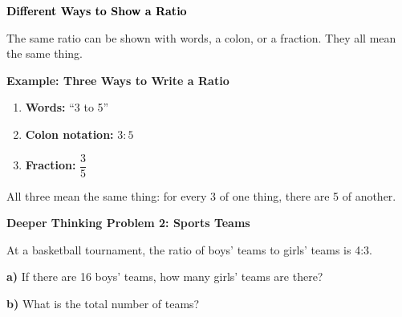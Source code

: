 \documentclass[12pt, letterpaper, fleqn]{article}
\begin{document}
\newpage

\begin{tcolorbox}[colback=customteal!20]
\large\textcolor{black}{\textbf{Different Ways to Show a Ratio}}
\end{tcolorbox}

\noindent
The same ratio can be shown with words, a colon, or a fraction. They all mean the same thing.

\vspace{3mm}

\begin{tcolorbox}[colback=white, colframe=black!50, boxrule=0.6pt, arc=4mm, left=6mm, right=6mm, top=5mm, bottom=5mm]

\textbf{Example: Three Ways to Write a Ratio}

\medskip

\begin{enumerate}
    \item \textbf{Words:} ``3 to 5''
    \item \textbf{Colon notation:} $3:5$
    \item \textbf{Fraction:} $\dfrac{3}{5}$
\end{enumerate}

\medskip

\noindent
All three mean the same thing: for every 3 of one thing, there are 5 of another.

\end{tcolorbox}

\vspace{4mm}

\begin{tcolorbox}[colback=white!15, colframe=black, boxrule=1.5pt, arc=4mm, left=6mm, right=6mm, top=5mm, bottom=5mm]

\textbf{Deeper Thinking Problem 2: Sports Teams}

\medskip

\noindent
At a basketball tournament, the ratio of boys' teams to girls' teams is 4:3.

\noindent
\textbf{a)} If there are 16 boys' teams, how many girls' teams are there?

\vspace{4cm}

\noindent
\textbf{b)} What is the total number of teams?

\vspace{4cm}

\end{tcolorbox}
\end{document}
